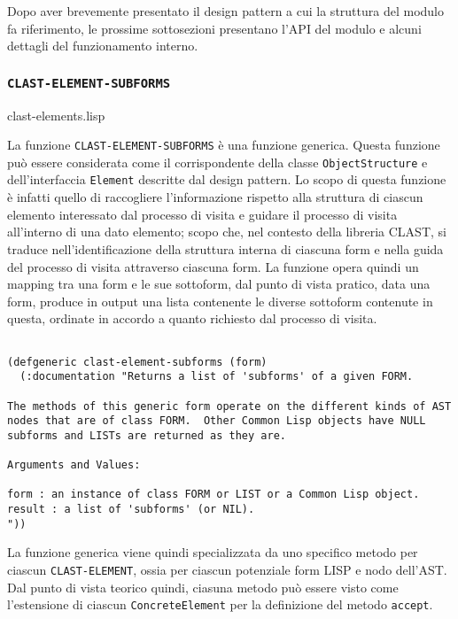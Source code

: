 Dopo aver brevemente presentato il design pattern a cui la struttura del
modulo fa riferimento, le prossime sottosezioni presentano l'API del modulo e
alcuni dettagli del funzionamento interno.

\subsubsection{\texttt{CLAST-ELEMENT-SUBFORMS}} clast-elements.lisp

La funzione \texttt{CLAST-ELEMENT-SUBFORMS} è una funzione generica. Questa
funzione può essere considerata come il corrispondente della classe
\texttt{ObjectStructure} e dell'interfaccia \texttt{Element} descritte dal
design pattern. Lo scopo di questa funzione è infatti quello di raccogliere
l'informazione rispetto alla struttura di ciascun elemento interessato dal
processo di visita e guidare il processo di visita all'interno di una dato
elemento; scopo che, nel contesto della libreria CLAST, si traduce
nell'identificazione della struttura interna di ciascuna form e nella guida
del processo di visita attraverso ciascuna form. La funzione opera quindi un
mapping tra una form e le sue sottoform, dal punto di vista pratico, data una
form, produce in output una lista contenente le diverse sottoform contenute in
questa, ordinate in accordo a quanto richiesto dal processo di visita.

\begin{lstlisting}[caption=Definizione della funzione \texttt
{CLAST-ELEMENT-SUBFORMS}]

(defgeneric clast-element-subforms (form)
  (:documentation "Returns a list of 'subforms' of a given FORM.

The methods of this generic form operate on the different kinds of AST
nodes that are of class FORM.  Other Common Lisp objects have NULL
subforms and LISTs are returned as they are.

Arguments and Values:

form : an instance of class FORM or LIST or a Common Lisp object.
result : a list of 'subforms' (or NIL).
"))

\end{lstlisting}

La funzione generica viene quindi specializzata da uno specifico metodo per
ciascun \texttt{CLAST-ELEMENT}, ossia per ciascun potenziale form LISP e nodo
dell'AST. Dal punto di vista teorico quindi, ciasuna metodo può essere visto
come l'estensione di ciascun \texttt{ConcreteElement} per la definizione del
metodo \texttt{accept}.\\

